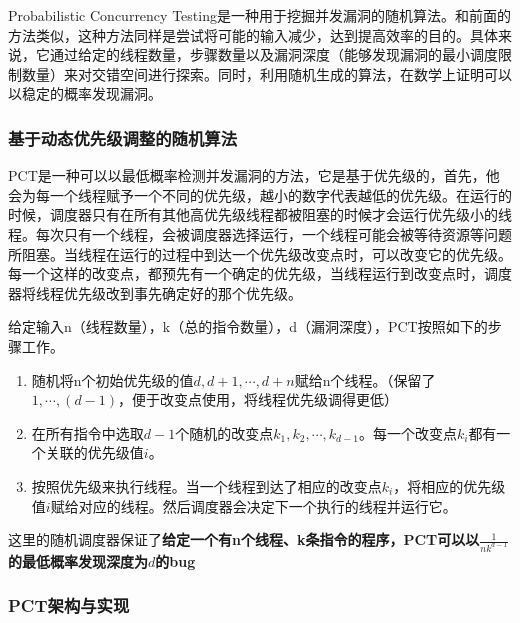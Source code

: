 Probabilistic Concurrency Testing是一种用于挖掘并发漏洞的随机算法。和前面的方法类似，这种方法同样是尝试将可能的输入减少，达到提高效率的目的。具体来说，它通过给定的线程数量，步骤数量以及漏洞深度（能够发现漏洞的最小调度限制数量）来对交错空间进行探索。同时，利用随机生成的算法，在数学上证明可以以稳定的概率发现漏洞。

\subsubsection{基于动态优先级调整的随机算法}

PCT是一种可以以最低概率检测并发漏洞的方法，它是基于优先级的，首先，他会为每一个线程赋予一个不同的优先级，越小的数字代表越低的优先级。在运行的时候，调度器只有在所有其他高优先级线程都被阻塞的时候才会运行优先级小的线程。每次只有一个线程，会被调度器选择运行，一个线程可能会被等待资源等问题所阻塞。当线程在运行的过程中到达一个优先级改变点时，可以改变它的优先级。每一个这样的改变点，都预先有一个确定的优先级，当线程运行到改变点时，调度器将线程优先级改到事先确定好的那个优先级。

给定输入n（线程数量），k（总的指令数量），d（漏洞深度），PCT按照如下的步骤工作。

\begin{enumerate}
\item 随机将n个初始优先级的值$d, d+1, \cdots, d+n$赋给n个线程。（保留了$1,\cdots, (d-1)$，便于改变点使用，将线程优先级调得更低）
\item 在所有指令中选取$d-1$个随机的改变点$k_1, k_2, \cdots, k_{d-1}$。每一个改变点$k_i$都有一个关联的优先级值$i$。
\item 按照优先级来执行线程。当一个线程到达了相应的改变点$k_i$，将相应的优先级值$i$赋给对应的线程。然后调度器会决定下一个执行的线程并运行它。
\end{enumerate}

这里的随机调度器保证了\textbf{给定一个有n个线程、k条指令的程序，PCT可以以$\frac{1}{nk^{d-1}}$的最低概率发现深度为$d$的bug}

\subsubsection{PCT架构与实现}

